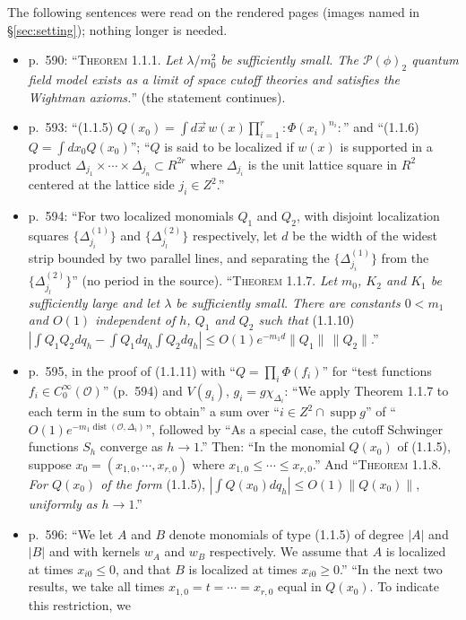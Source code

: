 \documentclass[11pt,a4paper]{article}
\theoremstyle{plain}
\theoremstyle{definition}
\begin{document}
The following sentences were read on the rendered pages (images named in \S\ref{sec:setting});
nothing longer is needed.
\begin{itemize}
\item p.~590: ``\textsc{Theorem} 1.1.1. \emph{Let $\lambda/m_0^2$ be sufficiently small.  The
$\mathscr P(\phi)_2$ quantum field model exists as a limit of space cutoff theories and satisfies
the Wightman axioms.}'' (the statement continues).
\item p.~593: ``(1.1.5) $Q(x_0)=\int d\vec x\,w(x)\prod_{i=1}^r{:}\Phi(x_i)^{n_i}{:}$'' and
``(1.1.6) $Q=\int dx_0Q(x_0)$''; ``$Q$ is said to be localized if $w(x)$ is supported in a
product $\Delta_{j_1}\times\cdots\times\Delta_{j_n}\subset R^{2r}$ where $\Delta_{j_i}$ is the unit
lattice square in $R^2$ centered at the lattice side $j_i\in Z^2$.''
\item p.~594: ``For two localized monomials $Q_1$ and $Q_2$, with disjoint localization squares
$\{\Delta^{(1)}_{j_i}\}$ and $\{\Delta^{(2)}_{j_l}\}$ respectively, let $d$ be the width of the
widest strip bounded by two parallel lines, and separating the $\{\Delta^{(1)}_{j_i}\}$ from the
$\{\Delta^{(2)}_{j_l}\}$'' (no period in the source).  ``\textsc{Theorem} 1.1.7. \emph{Let $m_0$,
$K_2$ and $K_1$ be sufficiently large and let $\lambda$ be sufficiently small.  There are constants
$0<m_1$ and $O(1)$ independent of $h$, $Q_1$ and $Q_2$ such that} (1.1.10)
$|\int Q_1Q_2dq_h-\int Q_1dq_h\int Q_2dq_h|\le O(1)e^{-m_1d}\|Q_1\|\,\|Q_2\|$.''
\item p.~595, in the proof of (1.1.11) with ``$Q=\prod_i\Phi(f_i)$'' for ``test functions
$f_i\in C_0^\infty(\mathcal O)$'' (p.~594) and $V(g_i)$, $g_i=g\chi_{\Delta_i}$: ``We apply
Theorem 1.1.7 to each term in the sum to obtain'' a sum over ``$i\in Z^2\cap\operatorname{supp}g$''
of ``$O(1)e^{-m_1\operatorname{dist}(\mathcal O,\Delta_i)}$'', followed by ``As a special case,
the cutoff Schwinger functions $S_h$ converge as $h\to1$.''  Then: ``In the monomial $Q(x_0)$
of (1.1.5), suppose $x_0=(x_{1,0},\cdots,x_{r,0})$ where $x_{1,0}\le\cdots\le x_{r,0}$.''  And
``\textsc{Theorem} 1.1.8. \emph{For $Q(x_0)$ of the form} (1.1.5), $|\int Q(x_0)dq_h|\le
O(1)\|Q(x_0)\|$, \emph{uniformly as $h\to1$}.''
\item p.~596: ``We let $A$ and $B$ denote monomials of type (1.1.5) of degree $|A|$ and $|B|$ and
with kernels $w_A$ and $w_B$ respectively.  We assume that $A$ is localized at times
$x_{i0}\le0$, and that $B$ is localized at times $x_{i0}\ge0$.''  ``In the next two results, we
take all times $x_{1,0}=t=\cdots=x_{r,0}$ equal in $Q(x_0)$.  To indicate this restriction, we

\end{itemize}
\end{document}
